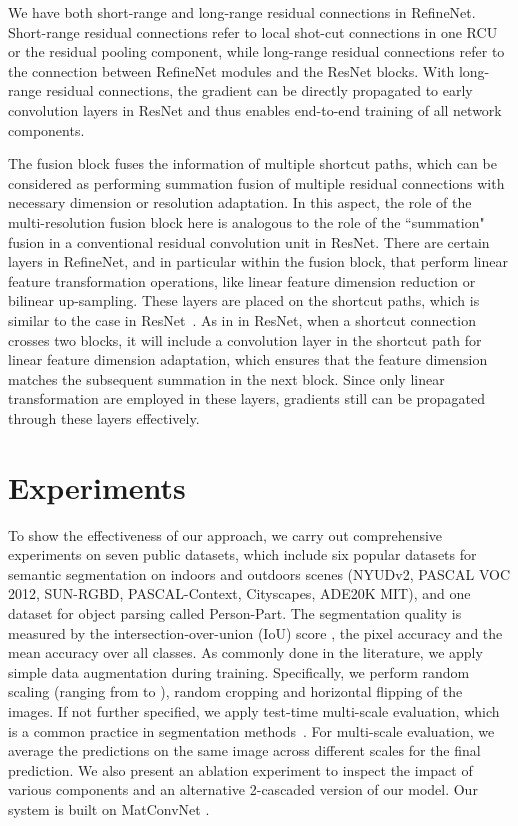 \documentclass[10pt,twocolumn,letterpaper]{article}
\begin{document}
We have both short-range and long-range residual connections in RefineNet.
Short-range residual connections refer to local shot-cut connections in one RCU or the residual pooling component,
while long-range residual connections refer to the connection between RefineNet modules and the ResNet blocks.
With long-range residual connections,
the gradient can be directly propagated to early convolution layers in ResNet and thus enables end-to-end training of all network components. 


The fusion block fuses the information of multiple shortcut paths, which can be considered as performing summation fusion of multiple residual connections with necessary dimension or resolution adaptation. In this aspect, the role of the multi-resolution fusion block here is analogous to the role of the ``summation" fusion in a conventional residual convolution unit in ResNet.
There are certain layers in RefineNet, and in particular within the fusion block, that perform linear feature transformation operations, like linear feature dimension 
reduction or bilinear up-sampling.
These layers are placed on the shortcut paths,
which is similar to the case in ResNet~\cite{He:2016:ResNet}. 
As in in ResNet, when a shortcut connection crosses two blocks, it will include a convolution layer in the shortcut path for linear feature dimension adaptation, 
which ensures that the feature dimension matches the subsequent summation in the next block. 
Since only linear transformation are employed in these layers, gradients still can be propagated through these layers effectively.




 
\section{Experiments}
\label{sec:experiments}
To show the effectiveness of our approach, we carry out comprehensive experiments on seven public datasets, which include six popular datasets for semantic segmentation on indoors and outdoors scenes (NYUDv2, PASCAL VOC 2012, SUN-RGBD, PASCAL-Context, Cityscapes, ADE20K MIT), and one dataset for object parsing called Person-Part.
The segmentation quality is measured by the intersection-over-union (IoU) score \cite{everingham2010pascal}, the pixel accuracy and the mean accuracy \cite{LongSD14} over all classes.
As commonly done in the literature, we apply simple data augmentation during training. Specifically, we perform random scaling (ranging from  to ), random cropping and horizontal flipping of the images.
If not further specified, we apply test-time multi-scale evaluation, which is a common practice in segmentation methods~\cite{Dai2015arXiv,ChenPK0Y16}.
For multi-scale evaluation, we average the predictions on the same image across different scales for the final prediction.
We also present an ablation experiment to inspect the impact of various components and an alternative 2-cascaded version of our model.
Our system is built on MatConvNet \cite{matconvnet}.
\end{document}
